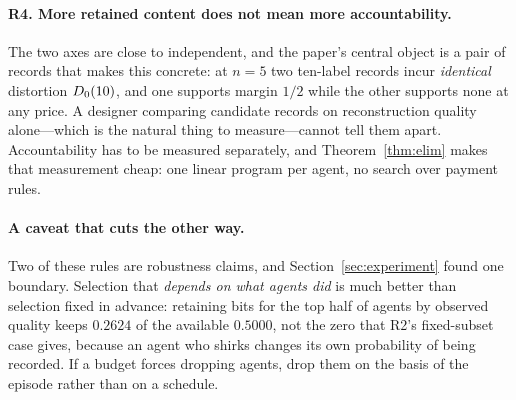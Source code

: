 \paragraph{R4. More retained content does not mean more accountability.}
The two axes are close to independent, and the paper's central object is a pair
of records that makes this concrete: at $n = 5$ two ten-label records incur
\emph{identical} distortion $D_0(10)$, and one supports margin $1/2$ while the
other supports none at any price. A designer comparing candidate records on
reconstruction quality alone---which is the natural thing to measure---cannot
tell them apart. Accountability has to be measured separately, and
Theorem~\ref{thm:elim} makes that measurement cheap: one linear program per
agent, no search over payment rules.

\paragraph{A caveat that cuts the other way.}
Two of these rules are robustness claims, and Section~\ref{sec:experiment} found
one boundary. Selection that \emph{depends on what agents did} is much better
than selection fixed in advance: retaining bits for the top half of agents by
observed quality keeps $0.2624$ of the available $0.5000$, not the zero that R2's
fixed-subset case gives, because an agent who shirks changes its own probability
of being recorded. If a budget forces dropping agents, drop them on the basis of
the episode rather than on a schedule.

